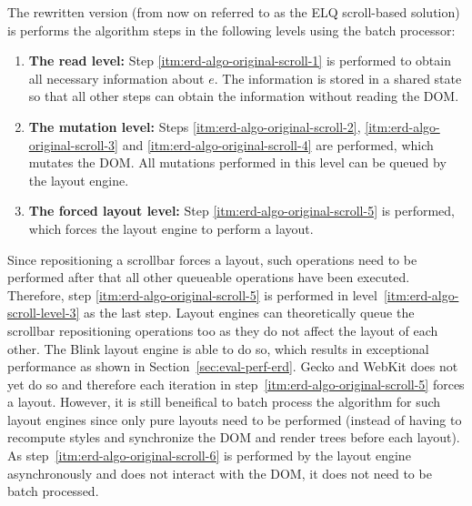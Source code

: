 \documentclass[a4paper,11pt]{kth-mag}
\begin{document}
        The rewritten version (from now on referred to as the \gls{ELQ} scroll-based solution) is performs the algorithm steps in the following levels using the batch processor:
        \begin{enumerate}
          \item\label{itm:erd-algo-scroll-level-1}
            \textbf{The read level:}
            Step \ref{itm:erd-algo-original-scroll-1} is performed to obtain all necessary information about $e$.
            The information is stored in a shared state so that all other steps can obtain the information without reading the \gls{DOM}.
          \item\label{itm:erd-algo-scroll-level-2}
            \textbf{The mutation level:}
            Steps \ref{itm:erd-algo-original-scroll-2}, \ref{itm:erd-algo-original-scroll-3} and \ref{itm:erd-algo-original-scroll-4} are performed, which mutates the \gls{DOM}.
            All mutations performed in this level can be queued by the layout engine.
          \item\label{itm:erd-algo-scroll-level-3}
            \textbf{The forced layout level:}
            Step \ref{itm:erd-algo-original-scroll-5} is performed, which forces the layout engine to perform a layout.
        \end{enumerate}
        Since repositioning a scrollbar forces a layout, such operations need to be performed after that all other queueable operations have been executed.
        Therefore, step \ref{itm:erd-algo-original-scroll-5} is performed in level~\ref{itm:erd-algo-scroll-level-3} as the last step.
        Layout engines can theoretically queue the scrollbar repositioning operations too as they do not affect the layout of each other.
        The Blink layout engine is able to do so, which results in exceptional performance as shown in Section~\ref{sec:eval-perf-erd}.
        Gecko and WebKit does not yet do so and therefore each iteration in step~\ref{itm:erd-algo-original-scroll-5} forces a layout.
        However, it is still beneifical to batch process the algorithm for such layout engines since only pure layouts need to be performed (instead of having to recompute styles and synchronize the \gls{DOM} and render trees before each layout).        
        As step~\ref{itm:erd-algo-original-scroll-6} is performed by the layout engine asynchronously and does not interact with the \gls{DOM}, it does not need to be batch processed.
\end{document}
